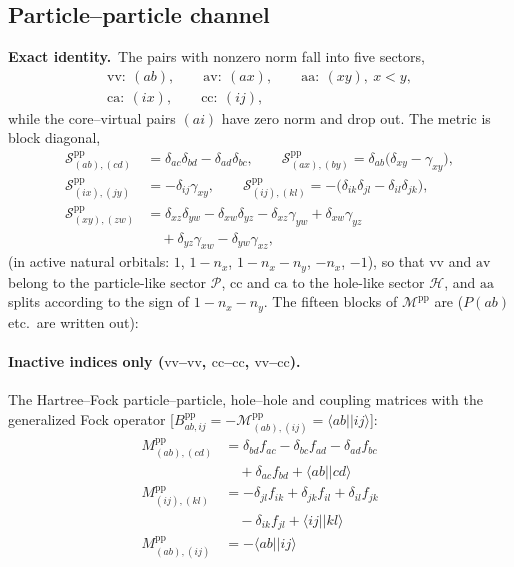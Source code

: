 \documentclass[aip,jcp,reprint,noshowkeys,superscriptaddress]{revtex4-1}
\newcommand{\bcalM}{\boldsymbol{\mathcal M}}
\newcommand{\pp}{\text{pp}}
\newcommand{\sca}{\text{ca}}
\newcommand{\sav}{\text{av}}
\newcommand{\saa}{\text{aa}}
\newcommand{\svv}{\text{vv}}
\newcommand{\scc}{\text{cc}}
\newcommand{\Exact}{\textbf{Exact identity.}\ }
\begin{document}
\subsection{Particle--particle channel}
\label{sec:pp-blocks}

\Exact The pairs with nonzero norm fall into five sectors,
\begin{align}
  \svv:\ (ab),\qquad \sav:\ (ax),\qquad \saa:\ (xy),\ x<y,
  \nonumber\\
  \sca:\ (ix),\qquad \scc:\ (ij),
  \label{eq:pp-sectors}
\end{align}
while the core--virtual pairs $(ai)$ have zero norm and drop out.  The metric
is block diagonal,
\begin{align}
  \mathcal S^{\pp}_{(ab),(cd)}&=\delta_{ac}\delta_{bd}-\delta_{ad}\delta_{bc},\qquad
  \mathcal S^{\pp}_{(ax),(by)}=\delta_{ab}\bigl(\delta_{xy}-\gamma_{xy}\bigr),
  \nonumber\\
  \mathcal S^{\pp}_{(ix),(jy)}&=-\delta_{ij}\gamma_{xy},\qquad
  \mathcal S^{\pp}_{(ij),(kl)}=-\bigl(\delta_{ik}\delta_{jl}-\delta_{il}\delta_{jk}\bigr),
  \nonumber\\
  \mathcal S^{\pp}_{(xy),(zw)}&=\delta_{xz}\delta_{yw}-\delta_{xw}\delta_{yz}
  -\delta_{xz}\gamma_{yw}+\delta_{xw}\gamma_{yz}
  \nonumber\\
  &\quad+\delta_{yz}\gamma_{xw}-\delta_{yw}\gamma_{xz},
  \label{eq:pp-S-blocks}
\end{align}
(in active natural orbitals: $1$, $1-n_x$, $1-n_x-n_y$, $-n_x$, $-1$), so that
$\svv$ and $\sav$ belong to the particle-like sector $\mathcal P$, $\scc$ and
$\sca$ to the hole-like sector $\mathcal H$, and $\saa$ splits according to the
sign of $1-n_x-n_y$.  The fifteen blocks of $\bcalM^{\pp}$ are
($P(ab)$ etc.\ are written out):

\paragraph*{Inactive indices only ($\svv$--$\svv$, $\scc$--$\scc$, $\svv$--$\scc$).}
The Hartree--Fock particle--particle, hole--hole and coupling matrices with the
generalized Fock operator [$B^{\pp}_{ab,ij}=-\mathcal M^{\pp}_{(ab),(ij)}=\langle ab||ij\rangle$]:
\begin{align}
  M^{\pp}_{(ab),(cd)} &= \delta_{bd}f_{ac} -\delta_{bc}f_{ad} -\delta_{ad}f_{bc} \nonumber\\
  &\quad +\delta_{ac}f_{bd} +\langle ab||cd\rangle
  \label{eq:pp-vv-vv}\\
  M^{\pp}_{(ij),(kl)} &= -\delta_{jl}f_{ik} +\delta_{jk}f_{il} +\delta_{il}f_{jk} \nonumber\\
  &\quad -\delta_{ik}f_{jl} +\langle ij||kl\rangle
  \label{eq:pp-cc-cc}\\
  M^{\pp}_{(ab),(ij)} &= -\langle ab||ij\rangle
  \label{eq:pp-vv-cc}
\end{align}
\end{document}
